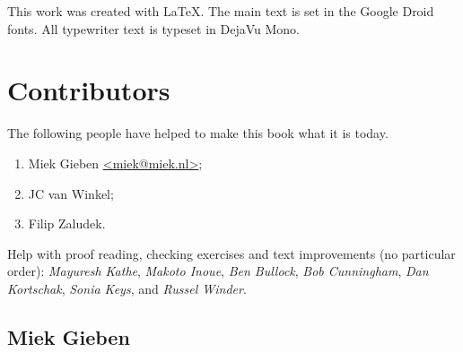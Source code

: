 \noindent{}This work was created with \LaTeX. The main text is set in
the Google Droid fonts. All typewriter text is typeset in DejaVu Mono.

\section{Contributors}
The following people have helped to make this book what it is today.
\begin{enumerate}
\item{Miek Gieben \qquad\url{<miek@miek.nl>}};
\item{JC van Winkel};
\item{Filip Zaludek}.
\end{enumerate}

Help with proof reading, checking exercises and text improvements (no
particular order):
\emph{Mayuresh Kathe},
\emph{Makoto Inoue},
\emph{Ben Bullock},
\emph{Bob Cunningham},
\emph{Dan Kortschak},
\emph{Sonia Keys},
and \emph{Russel Winder}.

\subsection{Miek Gieben}

